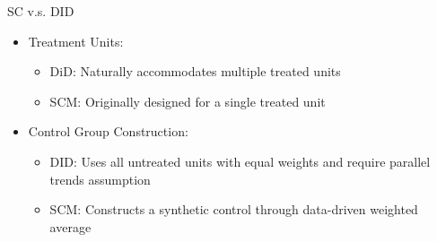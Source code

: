 \documentclass[dvipsnames,hyperref={pdfpagelabels=false}]{beamer}
\begin{document}
\begin{frame}{SC v.s. DID}{}
	\begin{itemize}
	
		
		
			\item Treatment Units:
				\vspace{0.2cm}
		\begin{itemize}
			\item DiD: Naturally accommodates multiple treated units
				\vspace{0.2cm}
			\item SCM: Originally designed for a single treated unit 
            				\vspace{0.2cm}
		\end{itemize}
		
		
		\item Control Group Construction:
						\vspace{0.2cm}
		\begin{itemize}
			\item DID: Uses all untreated units with equal weights and require parallel trends assumption
								\vspace{0.2cm}
			\item SCM: Constructs a synthetic control through data-driven weighted average
		\end{itemize}
		\vspace{0.2cm}
		
		
		
		
		
		
	
	\end{itemize}
\end{frame}
\end{document}
